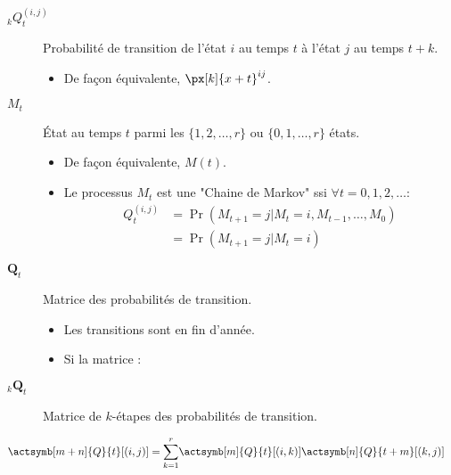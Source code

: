 \documentclass[10pt, french]{article}
\begin{document}
\begin{multicols*}{2}
\begin{description}
	\item[$_{k}Q_{t}^{(i, j)}$]	Probabilité de transition de l'état $i$ au temps $t$ à l'état $j$ au temps $t + k$.
		\begin{itemize}[leftmargin = *]
		\item	De façon équivalente, $\px[k]{x + t}^{ij}$.
		\end{itemize}
	\item[$M_{t}$]	État au temps $t$ parmi les $\{1, 2, \dots, r\}$ ou $\{0, 1, \dots, r\}$ états.
		\begin{itemize}[leftmargin = *]
		\item	De façon équivalente, $M(t)$.
		\item	Le processus $M_{t}$ est une "Chaine de Markov" ssi $\forall t = 0, 1, 2, \dots$:
		\begin{align*}
		Q_{t}^{(i, j)}
		&=	\Pr(M_{t + 1} = j | M_{t} = i, M_{t - 1}, \dots, M_{0})	\\
		&=	\Pr(M_{t + 1} = j | M_{t} = i)	
		\end{align*}
		\end{itemize}
	\item[$\bm{Q}_{t}$]	Matrice des probabilités de transition.
		\begin{itemize}[leftmargin = *]
		\item	Les transitions sont en fin d'année.
		\item	Si la matrice :
		\end{itemize}
	\item[$_{k}\bm{Q}_{t}$]	Matrice de $k$-étapes des probabilités de transition.
\end{description}

\begin{align*}
	\actsymb[m + n]{Q}{t}[(i, j)]
	&=	\sumz{r}{k = 1}\actsymb[m]{Q}{t}[(i, k)] \actsymb[n]{Q}{t + m}[(k, j)]
\end{align*}

\columnbreak


\end{multicols*}
\end{document}
